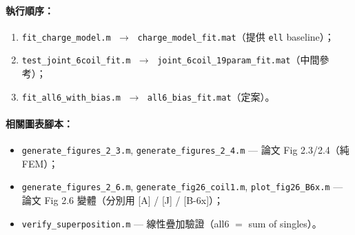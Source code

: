 \documentclass[11pt,a4paper]{article}
\begin{document}
\paragraph{執行順序：}
\begin{enumerate}[leftmargin=*]
\item \texttt{fit\_charge\_model.m}     \(\;\rightarrow\;\) \texttt{charge\_model\_fit.mat}（提供 \texttt{ell} baseline）；
\item \texttt{test\_joint\_6coil\_fit.m} \(\;\rightarrow\;\) \texttt{joint\_6coil\_19param\_fit.mat}（中間參考）；
\item \texttt{fit\_all6\_with\_bias.m}   \(\;\rightarrow\;\) \texttt{all6\_bias\_fit.mat}（定案）。
\end{enumerate}

\paragraph{相關圖表腳本：}
\begin{itemize}[leftmargin=*]
\item \texttt{generate\_figures\_2\_3.m}, \texttt{generate\_figures\_2\_4.m} — 論文 Fig 2.3/2.4（純 FEM）；
\item \texttt{generate\_figures\_2\_6.m}, \texttt{generate\_fig26\_coil1.m},
       \texttt{plot\_fig26\_B6x.m} — 論文 Fig 2.6 變體（分別用 [A] / [J] / [B-6x]）；
\item \texttt{verify\_superposition.m} — 線性疊加驗證（all6 \(=\) sum of singles）。
\end{itemize}
\end{document}
